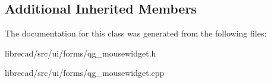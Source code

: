 \subsection*{Additional Inherited Members}


The documentation for this class was generated from the following files\-:\begin{DoxyCompactItemize}
\item 
librecad/src/ui/forms/qg\-\_\-mousewidget.\-h\item 
librecad/src/ui/forms/qg\-\_\-mousewidget.\-cpp\end{DoxyCompactItemize}
